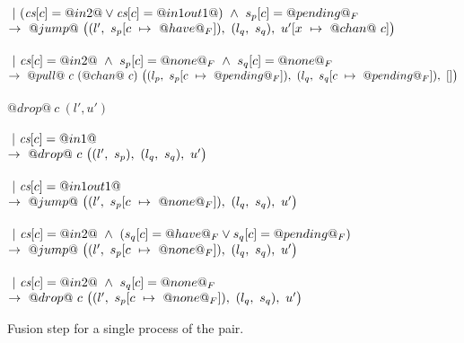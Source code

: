 \begin{figure*}
\begin{tabbing}
\> \>  \\
\> \> $~|~(\cs[c]=@in2@ \vee \cs[c]=@in1out1@) ~\wedge~ s_p[c]=@pending@_F$ \\
\> \> $\to~@jump@~
      \nextStep
        {l'}
          {\HeapUpdateOne{c}{@have@_F}{s_p}}
        {l_q}
          {s_q}
        {\HeapUpdateOne{x}{@chan@~c}{u'}}
        $ \\

\> \> \\
\> \> $~|~\cs[c]=@in2@ ~\wedge~ s_p[c]=@none@_F ~\wedge~ s_q[c]=@none@_F$ \\
\> \> $\to~@pull@~c~(@chan@~c)~
      \nextStep
        {l_p}
          {\HeapUpdateOne{c}{@pending@_F}{s_p}}
        {l_q}
          {\HeapUpdateOne{c}{@pending@_F}{s_q}}
        {[]}
  $ \\
\\

\> $@drop@~c~(l',u')$ \\
\> \>  \\
\> \> $~|~\cs[c]=@in1@$ \\
\> \> $\to~@drop@~c~
      \nextStep
        {l'}
          {s_p}
        {l_q}
          {s_q}
        {u'}
      $ \\

\> \> \\
\> \> $~|~\cs[c]=@in1out1@$ \\
\> \> $\to~@jump@~
      \nextStep
        {l'}
          {\HeapUpdateOne{c}{@none@_F}{s_p}}
        {l_q}
          {s_q}
        {u'}
      $ \\

\> \> \\
\> \> $~|~\cs[c]=@in2@ ~\wedge~ (s_q[c]=@have@_F \vee s_q[c]=@pending@_F)$ \\
\> \> $\to~@jump@~
      \nextStep
        {l'}
          {\HeapUpdateOne{c}{@none@_F}{s_p}}
        {l_q}
          {s_q}
        {u'}
      $ \\


\> \> \\
\> \> $~|~\cs[c]=@in2@ ~\wedge~ s_q[c]=@none@_F$ \\
\> \> $\to~@drop@~c~
      \nextStep
        {l'}
          {\HeapUpdateOne{c}{@none@_F}{s_p}}
        {l_q}
          {s_q}
        {u'}
      $
\end{tabbing}

\caption{Fusion step for a single process of the pair.} 

\label{fig:Fusion:Def:Step}
\end{figure*}

